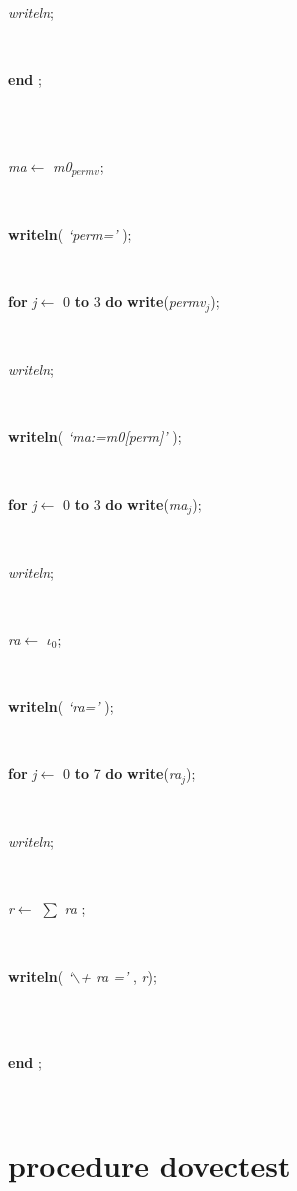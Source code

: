 \documentclass[10pt, a4paper]{article}
\begin{document}
\begin{tabbing}
\parbox{14cm}{\textsf{\textit{writeln}}; }\\
\<\-\parbox{14cm}{\textsf{\textbf{end} ;}}\\
\\
\parbox{14cm}{\textsf{\textit{ma}$\leftarrow$ \textit{m0}$_{\textit{permv}}$}; }\\
\parbox{14cm}{\textsf{\textbf{writeln}(\textit{\textrm{\textup { `perm=' } }})}; }\\
\parbox{14cm}{\textsf {\textbf {for } \textsf{\textit{j}$\leftarrow$ 0} \textbf{ to } \textsf{3} \textbf{ do } \textsf{\textbf{write}(\textit{permv}$_{\textit{j}}$)}; }}\\
\parbox{14cm}{\textsf{\textit{writeln}}; }\\
\parbox{14cm}{\textsf{\textbf{writeln}(\textit{\textrm{\textup { `ma:=m0[perm]' } }})}; }\\
\parbox{14cm}{\textsf {\textbf {for } \textsf{\textit{j}$\leftarrow$ 0} \textbf{ to } \textsf{3} \textbf{ do } \textsf{\textbf{write}(\textit{ma}$_{\textit{j}}$)}; }}\\
\parbox{14cm}{\textsf{\textit{writeln}}; }\\
\parbox{14cm}{\textsf{\textit{ra}$\leftarrow$ $\iota_{ 0 }$}; }\\
\parbox{14cm}{\textsf{\textbf{writeln}(\textit{\textrm{\textup { `ra=' } }})}; }\\
\parbox{14cm}{\textsf {\textbf {for } \textsf{\textit{j}$\leftarrow$ 0} \textbf{ to } \textsf{7} \textbf{ do } \textsf{\textbf{write}(\textit{ra}$_{\textit{j}}$)}; }}\\
\parbox{14cm}{\textsf{\textit{writeln}}; }\\
\parbox{14cm}{\textsf{\textit{r}$\leftarrow$  $\sum$  \textit{ra} }; }\\
\parbox{14cm}{\textsf{\textbf{writeln}(\textit{\textrm{\textup { `$ \backslash $+ ra =' } }}, \textit{r})}; }\\
\\
\<\-\parbox{14cm}{\textsf{\textbf{end} ;}}\\
\end{tabbing}
\section{procedure dovectest}\label{sec:vectestdovectest}
\end{document}
